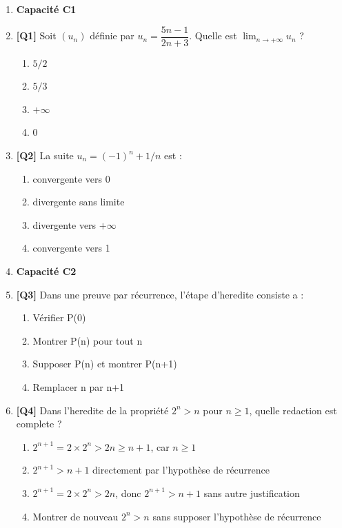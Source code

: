 \begin{enumerate}

\item[] \textbf{Capacité C1}

\item \textbf{[Q1]} Soit $(u_n)$ définie par $u_n = \dfrac{5n - 1}{2n + 3}$. Quelle est $\lim_{n \to +\infty} u_n$ ?
  \begin{enumerate}[label=\Alph*.]
    \item $5/2$
    \item $5/3$
    \item $+\infty$
    \item $0$
  \end{enumerate}

\item \textbf{[Q2]} La suite $u_n = (-1)^n + 1/n$ est :
  \begin{enumerate}[label=\Alph*.]
    \item convergente vers 0
    \item divergente sans limite
    \item divergente vers $+\infty$
    \item convergente vers 1
  \end{enumerate}

\item[] \textbf{Capacité C2}

\item \textbf{[Q3]} Dans une preuve par récurrence, l'étape d'heredite consiste a :
  \begin{enumerate}[label=\Alph*.]
    \item Vérifier P(0)
    \item Montrer P(n) pour tout n
    \item Supposer P(n) et montrer P(n+1)
    \item Remplacer n par n+1
  \end{enumerate}

\item \textbf{[Q4]} Dans l'heredite de la propriété $2^n > n$ pour $n \geqslant 1$, quelle redaction est complete ?
  \begin{enumerate}[label=\Alph*.]
    \item $2^{n+1} = 2\times 2^n > 2n \geqslant n+1$, car $n \geqslant 1$
    \item $2^{n+1} > n+1$ directement par l'hypothèse de récurrence
    \item $2^{n+1} = 2\times 2^n > 2n$, donc $2^{n+1}>n+1$ sans autre justification
    \item Montrer de nouveau $2^n>n$ sans supposer l'hypothèse de récurrence
  \end{enumerate}


\end{enumerate}
